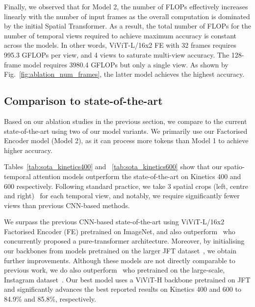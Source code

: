 \documentclass[10pt,twocolumn,letterpaper]{article}
\makeatletter
\renewcommand{\paragraph}{\@startsection{paragraph}{4}{\z@}{1.625ex \@plus 1ex \@minus .2ex}{-1em}{\normalfont\normalsize\bfseries}}
\makeatother
\begin{document}
Finally, we observed that for Model 2, the number of FLOPs effectively increases linearly with the number of input frames as the overall computation is dominated by the initial Spatial Transformer.
As a result, the total number of FLOPs for the number of temporal views required to achieve maximum accuracy is constant across the models.
In other words, ViViT-L/16x2 FE with 32 frames requires 995.3 GFLOPs per view, and 4 views to saturate multi-view accuracy.
The 128-frame model requires 3980.4 GFLOPs but only a single view.
As shown by Fig.~\ref{fig:ablation_num_frames}, the latter model achieves the highest accuracy.





\subsection{Comparison to state-of-the-art}\label{sec:exp_sota_comparison}
Based on our ablation studies in the previous section, we compare to the current state-of-the-art using two of our model variants.
We primarily use our Factorised Encoder model (Model 2), as it can process more tokens than Model 1 to achieve higher accuracy.

\vspace{-0\baselineskip}
\paragraph{Kinetics}
Tables~\ref{tab:sota_kinetics400} and ~\ref{tab:sota_kinetics600} show that our spatio-temporal attention models outperform the state-of-the-art on Kinetics 400 and 600 respectively.
Following standard practice, we take 3 spatial crops (left, centre and right)~\cite{feichtenhofer_iccv_2019,feichtenhofer_cvpr_2020,tran_iccv_2019,wang_cvpr_2018} for each temporal view, and notably, we require significantly fewer views than previous CNN-based methods.


We surpass the previous CNN-based state-of-the-art using ViViT-L/16x2 Factorised Encoder (FE) pretrained on ImageNet, and also outperform~\cite{bertasius_arxiv_2021} who concurrently proposed a pure-transformer architecture.
Moreover, by initialising our backbones from models pretrained on the larger JFT dataset~\cite{sun_iccv_2017}, we obtain further improvements. Although these models are not directly comparable to previous work, we do also outperform~\cite{tran_iccv_2019} who pretrained on the large-scale, Instagram dataset~\cite{mahajan_eccv_2018}. Our best model uses a ViViT-H backbone pretrained on JFT and significantly advances the best reported results on Kinetics 400 and 600 to 84.9\% and 85.8\%, respectively.
\end{document}
